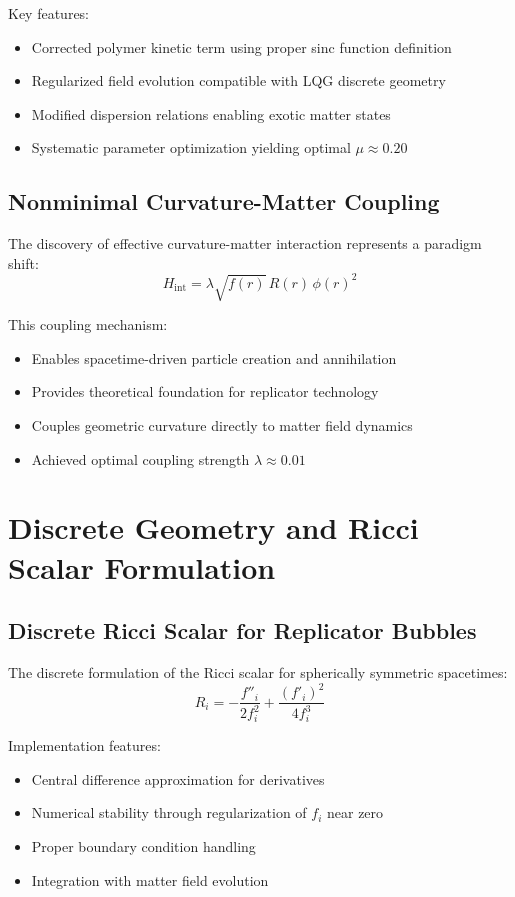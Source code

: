 \documentclass[11pt]{article}
\begin{document}
Key features:
\begin{itemize}
\item Corrected polymer kinetic term using proper sinc function definition
\item Regularized field evolution compatible with LQG discrete geometry
\item Modified dispersion relations enabling exotic matter states
\item Systematic parameter optimization yielding optimal $\mu \approx 0.20$
\end{itemize}

\subsection{Nonminimal Curvature-Matter Coupling}

The discovery of effective curvature-matter interaction represents a paradigm shift:
\begin{equation}
H_{\text{int}} = \lambda\sqrt{f(r)}\,R(r)\,\phi(r)^2
\end{equation}

This coupling mechanism:
\begin{itemize}
\item Enables spacetime-driven particle creation and annihilation
\item Provides theoretical foundation for replicator technology
\item Couples geometric curvature directly to matter field dynamics
\item Achieved optimal coupling strength $\lambda \approx 0.01$
\end{itemize}

\section{Discrete Geometry and Ricci Scalar Formulation}

\subsection{Discrete Ricci Scalar for Replicator Bubbles}

The discrete formulation of the Ricci scalar for spherically symmetric spacetimes:
\begin{equation}
R_i = -\frac{f''_i}{2f_i^2} + \frac{(f'_i)^2}{4f_i^3}
\end{equation}

Implementation features:
\begin{itemize}
\item Central difference approximation for derivatives
\item Numerical stability through regularization of $f_i$ near zero
\item Proper boundary condition handling
\item Integration with matter field evolution
\end{itemize}
\end{document}
